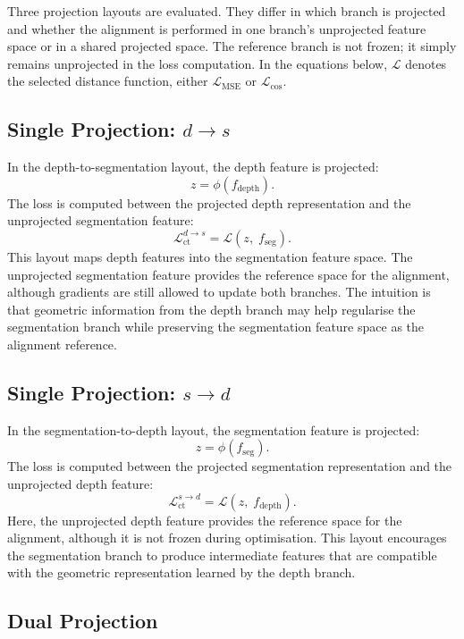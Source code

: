 Three projection layouts are evaluated. They differ in which branch is
projected and whether the alignment is performed in one branch's
unprojected feature space or in a shared projected space. The reference
branch is not frozen; it simply remains unprojected in the loss
computation. In the equations below, $\mathcal{L}$ denotes the selected
distance function, either $\mathcal{L}_\text{MSE}$ or
$\mathcal{L}_\text{cos}$.

\subsection{Single Projection: \texorpdfstring{$d \rightarrow s$}{d to s}}
\label{sec:single-dtos}

In the depth-to-segmentation layout, the depth feature is projected:
\[
    z = \phi(f_\text{depth}).
\]
The loss is computed between the projected depth representation and the
unprojected segmentation feature:
\[
    \mathcal{L}_\text{ct}^{d\rightarrow s}
    =
    \mathcal{L}(z,\; f_\text{seg}).
\]
This layout maps depth features into the segmentation feature space. The
unprojected segmentation feature provides the reference space for the
alignment, although gradients are still allowed to update both branches.
The intuition is that geometric information from the depth branch may help
regularise the segmentation branch while preserving the segmentation
feature space as the alignment reference.

\subsection{Single Projection: \texorpdfstring{$s \rightarrow d$}{s to d}}
\label{sec:single-stod}

In the segmentation-to-depth layout, the segmentation feature is projected:
\[
    z = \phi(f_\text{seg}).
\]
The loss is computed between the projected segmentation representation and
the unprojected depth feature:
\[
    \mathcal{L}_\text{ct}^{s\rightarrow d}
    =
    \mathcal{L}(z,\; f_\text{depth}).
\]
Here, the unprojected depth feature provides the reference space for the
alignment, although it is not frozen during optimisation. This layout
encourages the segmentation branch to produce intermediate features that
are compatible with the geometric representation learned by the depth
branch.

\subsection{Dual Projection}
\label{sec:dual-proj}

